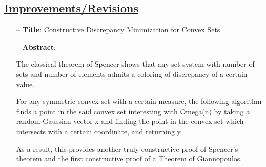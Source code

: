 \documentclass[11pt,twocolumn]{article}
\begin{document}
\subsection {\underline{Improvements/Revisions}}
\begin{itemize} 
	\item[--] {\bf{Title}}: Constructive Discrepancy Minimization for Convex Sets
	\item[--] {\bf{Abstract}}: 

The classical theorem of Spencer shows that any set system with number of sets and number of elements admits a coloring of discrepancy of a certain value.

For any symmetric convex set with a certain measure, the following algorithm finds a point in the said convex set interesting with Omega(n) by taking a random Gaussian vector x and finding the point in the convex set which intersects  with a certain coordinate, and returning y.

As a result, this provides another truly constructive proof of Spencer's theorem and the first constructive proof of a Theorem of Giannopoulos. \cite{convex}
\end{itemize}



\end{document}
